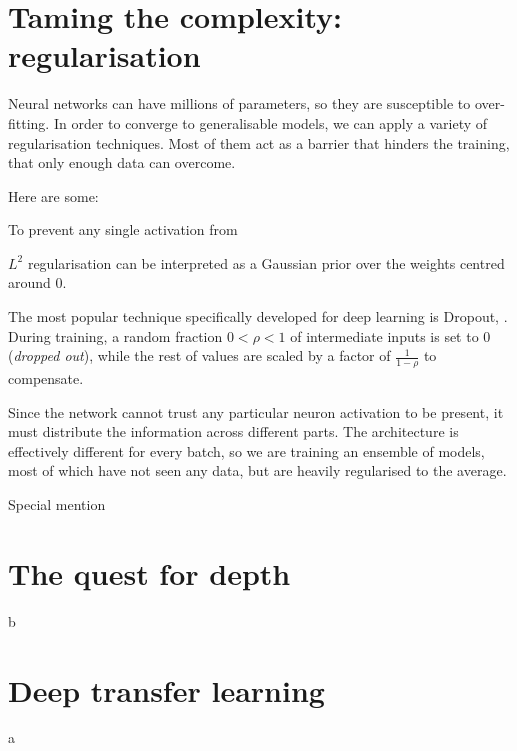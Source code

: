 \section{Taming the complexity: regularisation}
Neural networks can have millions of parameters, so they are susceptible to over-fitting.
In order to converge to generalisable models, we can apply a variety of regularisation techniques.
Most of them act as a barrier that hinders the training, that only enough data can overcome.


Here are some:


To prevent any single activation from 

$L^2$ regularisation can be interpreted as a Gaussian prior over the weights centred around $0$.

The most popular technique  
specifically developed for deep learning is Dropout, \citep{dropout}. 
During training, a random fraction $0 < \rho < 1$ of intermediate inputs is set to $0$ (\emph{dropped out}), while the rest of values are scaled by a factor of $\frac{1}{1-\rho}$ to compensate.

Since the network cannot trust any particular neuron activation to be present, it must distribute the information across different parts.
The architecture is effectively different for every batch, so we are training an ensemble of models, most of which have not seen any data, but are heavily regularised to the average.



Special mention



\section{The quest for depth}
b
\section{Deep transfer learning}
a


